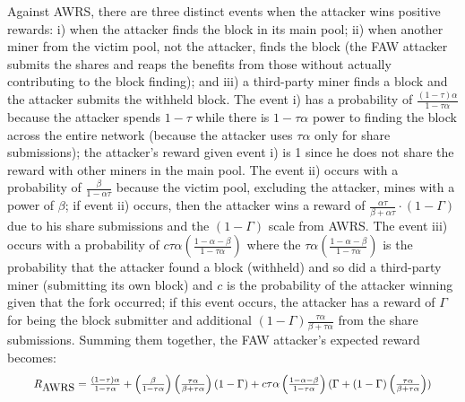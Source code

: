 Against AWRS, there are three distinct events when the attacker wins positive rewards:
i) when the attacker finds the block in its main pool; ii) when another miner from the victim pool, not the attacker, finds the block (the FAW attacker submits the shares and reaps the benefits from those without actually contributing to the block finding);
and iii) a third-party miner finds a block and the attacker submits the withheld block.
The event i) has a probability of $\frac{(1-\tau)\alpha}{1-\tau\alpha}$ because the attacker spends $1-\tau$
while there is $1-\tau\alpha$ power to finding the block across the entire network (because the attacker uses $\tau\alpha$ only for share submissions);
the attacker's reward given event i) is 1 since he does not share the reward with other miners in the main pool.
The event ii) occurs with a probability of $\frac{\beta}{1-\alpha\tau}$ because the victim pool, excluding the attacker, mines with a power of $\beta$;
if event ii) occurs, then the attacker wins a reward of $\frac{\alpha\tau}{\beta + \alpha \tau} \cdot (1-\Gamma)$ due to his share submissions and the $(1-\Gamma)$ scale from AWRS.
The event iii) occurs with a probability of $c\tau\alpha\left(\frac{1-\alpha-\beta}{1-\tau\alpha}\right)$
where the $\tau\alpha\left(\frac{1-\alpha-\beta}{1-\tau\alpha}\right)$ is the probability that the attacker found a block (withheld) and so did a third-party miner (submitting its own block) and $c$ is the probability of the attacker winning given that the fork occurred;
if this event occurs, the attacker has a reward of $\Gamma$ for being the block submitter and additional $(1-\Gamma) \frac{\tau\alpha}{\beta + \tau \alpha}$ from the share submissions.
Summing them together, the FAW attacker's expected reward becomes:
\begin{eqnarray}
\resizebox{.92\hsize}{!}{$
R_{\mbox{AWRS}}=\frac{(1-\tau)\alpha}{1-\tau\alpha}+\left(\frac{\beta}{1-\tau\alpha}\right)\left(\frac{\tau\alpha}{\beta+\tau\alpha}\right)(1-\Gamma)+c\tau\alpha\left(\frac{1-\alpha-\beta}{1-\tau\alpha}\right)(\Gamma+(1-\Gamma)\left(\frac{\tau\alpha}{\beta+\tau\alpha}\right))
$}
\label{eqn:reward_awrs}
\end{eqnarray}

